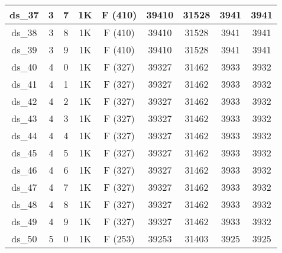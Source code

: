 \begin{footnotesize}
\begin{longtable}{|c|c|c|c|c|c|c|c|c|}
ds\_37      & 3           & 7           & 1K        & F (410)                     & 39410         & 31528          & 3941           & 3941          \\ \hline
ds\_38      & 3           & 8           & 1K        & F (410)                     & 39410         & 31528          & 3941           & 3941          \\ \hline
ds\_39      & 3           & 9           & 1K        & F (410)                     & 39410         & 31528          & 3941           & 3941          \\ \hline
ds\_40      & 4           & 0           & 1K        & F (327)                     & 39327         & 31462          & 3933           & 3932          \\ \hline
ds\_41      & 4           & 1           & 1K        & F (327)                     & 39327         & 31462          & 3933           & 3932          \\ \hline
ds\_42      & 4           & 2           & 1K        & F (327)                     & 39327         & 31462          & 3933           & 3932          \\ \hline
ds\_43      & 4           & 3           & 1K        & F (327)                     & 39327         & 31462          & 3933           & 3932          \\ \hline
ds\_44      & 4           & 4           & 1K        & F (327)                     & 39327         & 31462          & 3933           & 3932          \\ \hline
ds\_45      & 4           & 5           & 1K        & F (327)                     & 39327         & 31462          & 3933           & 3932          \\ \hline
ds\_46      & 4           & 6           & 1K        & F (327)                     & 39327         & 31462          & 3933           & 3932          \\ \hline
ds\_47      & 4           & 7           & 1K        & F (327)                     & 39327         & 31462          & 3933           & 3932          \\ \hline
ds\_48      & 4           & 8           & 1K        & F (327)                     & 39327         & 31462          & 3933           & 3932          \\ \hline
ds\_49      & 4           & 9           & 1K        & F (327)                     & 39327         & 31462          & 3933           & 3932          \\ \hline
ds\_50      & 5           & 0           & 1K        & F (253)                     & 39253         & 31403          & 3925           & 3925          \\ \hline

\end{longtable}
\end{footnotesize}
